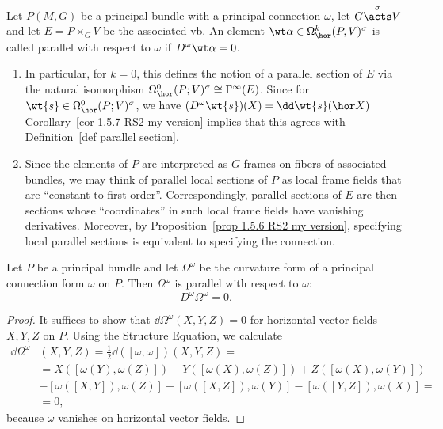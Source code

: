\begin{defn}\label{def parallel horizontal form}
    Let $P(M,G)$ be a principal bundle with a principal connection $\omega$, let $G\overset{\sigma}{\acts}V$ and let $E=P\times_G V$ be the associated \gls{vb}. An element $\wt\alpha\in\Omega^k_{\hor}(P,V)^\sigma$ is called parallel with respect to $\omega$ if $D^\omega\wt\alpha=0$.
\end{defn}

\begin{rem}
    \begin{enumerate}
        \item In particular, for $k=0$, this defines the notion of a parallel section of $E$ via the natural isomorphism $\Omega^0_{\hor}(P;V)^\sigma\cong \Gamma^\infty(E)$. Since for $\wt{s}\in \Omega^0_{\hor}(P;V)^\sigma$, we have $(D^\omega \wt{s})(X)=\dd \wt{s}(\hor X)$ Corollary~\ref{cor 1.5.7 RS2 my version} implies that this agrees with Definition~\ref{def parallel section}.
        \item Since the elements of $P$ are interpreted as $G$-frames on fibers of associated bundles, we may think of parallel local sections of $P$ as local frame fields that are ``constant to first order''. Correspondingly, parallel sections of $E$ are then sections whose ``coordinates'' in such local frame fields have vanishing derivatives. Moreover, by Proposition~\ref{prop 1.5.6 RS2 my version}, specifying local parallel sections is equivalent to specifying the connection.
    \end{enumerate}
\end{rem}


\begin{prop} \label{prop 1.4.11 RS2}
    Let $P$ be a principal bundle and let $\Omega^\omega$ be the curvature form of a principal connection form $\omega$ on $P$. Then $\Omega^\omega$ is parallel with respect to $\omega$:
    \[D^\omega\Omega^\omega=0.\label{eq 1.4.10 RS2 Bianchi}\]
\end{prop}
\begin{proof}
    It suffices to show that $\dd\Omega^\omega(X,Y,Z)=0$ for horizontal vector fields $X,Y,Z$ on $P$. Using the Structure Equation, we calculate
    \begin{align}
        \dd\Omega^\omega&(X,Y,Z)=\frac12\dd([\omega,\omega])(X,Y,Z)=\\
        &=X([\omega(Y),\omega(Z)])-Y([\omega(X),\omega(Z)])+Z([\omega(X),\omega(Y)])-\\
        &-[\omega([X,Y]),\omega(Z)]+[\omega([X,Z]),\omega(Y)]-[\omega([Y,Z]),\omega(X)]=\\
        &=0,
    \end{align}
    because $\omega$ vanishes on horizontal vector fields.
\end{proof}

